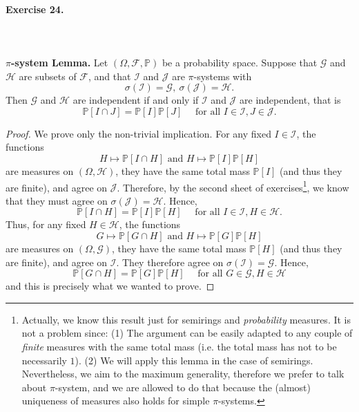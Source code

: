 \documentclass[12pt,a4paper]{report}
\theoremstyle{definition}
\theoremstyle{num.custom-title}
\renewcommand{\P}{\mathbb{P}}
\renewcommand{\1}{\mathbbm{1}}
\begin{document}
\paragraph{Exercise 24.} \ 
\\
\\
\textbf{$\pi$-system Lemma.} Let $(\Omega,\mathcal F, \P)$ be a probability space. Suppose that $\mathcal G$ and $\mathcal H$ are subsets of $\mathcal F$, and that $\mathcal I$ and $\mathcal J$ are $\pi$-systems with
\[
\sigma(\mathcal I) = \mathcal G, \ \sigma(\mathcal J)= \mathcal H.
\]
Then $\mathcal G$ and $\mathcal H$ are independent if and only if $\mathcal I$ and $\mathcal J$ are independent, that is
\[
\P[I \cap J] = \P[I] \P[J] \quad \text{ for all } I \in \mathcal I, J \in \mathcal J.
\]
\begin{proof}
We prove only the non-trivial implication. For any fixed $I \in \mathcal I$, the functions
\[
H \mapsto \P[I \cap H] \text{ and } H \mapsto \P[I]\P[H]
\]
are measures on $(\Omega, \mathcal H)$, they have the same total mass $\P[I]$ (and thus they are finite), and agree on $\mathcal J$. Therefore, by the second sheet of exercises\footnote{Actually, we know this result just for semirings and \emph{probability} measures. It is not a problem since: (1) The argument can be easily adapted to any couple of \emph{finite} measures with the same total mass (i.e. the total mass has not to be necessarily $1$). (2) We will apply this lemma in the case of semirings. Nevertheless, we aim to the maximum generality, therefore we prefer to talk about $\pi$-system, and we are allowed to do that because the (almost) uniqueness of measures also holds for simple $\pi$-systems.}, we know that they must agree on $\sigma(\mathcal J)=\mathcal H$. Hence, 
\[
\P[I \cap H] = \P[I] \P[H] \quad \text{ for all } I \in \mathcal I, H \in \mathcal H.
\]
Thus, for any fixed $H \in \mathcal H$, the functions
\[
G \mapsto \P[G \cap H] \text{ and } H \mapsto \P[G]\P[H]
\]
are measures on $(\Omega, \mathcal G)$, they have the same total mass $\P[H]$ (and thus they are finite), and agree on $\mathcal I$. They therefore agree on $\sigma(\mathcal I) = \mathcal G$. Hence,
\[
\P[G \cap H] = \P[G] \P[H] \quad \text{ for all } G \in \mathcal G, H \in \mathcal H
\]
and this is precisely what we wanted to prove.
\end{proof}
\end{document}
